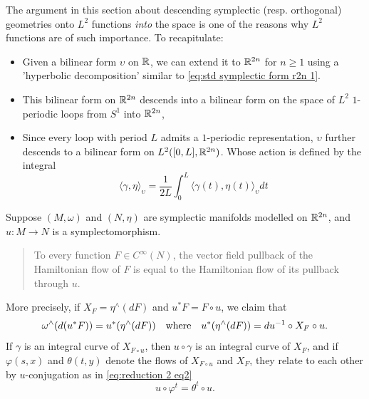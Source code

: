 \documentclass[../main-v2-manifolds.tex]{subfiles}
\begin{document}
%
%
%
%
%
%
\begin{note}
    The argument in this section about descending symplectic (resp. orthogonal) geometries onto $L^2$ functions \emph{into} the space is one of the reasons why $L^2$ functions are of such importance. To recapitulate:
    \begin{itemize}
        \item Given a bilinear form $\upsilon$ on $\mathbb{R}$, we can extend it to ${\mathbb{R}^{2n}}$ for $n\geq 1$ using a 'hyperbolic decomposition' similar to \cref{eq:std symplectic form r2n 1}.
        \item This bilinear form on ${\mathbb{R}^{2n}}$ descends into a bilinear form on the space of $L^2$ $1$-periodic loops from $S^1$ into ${\mathbb{R}^{2n}}$,
        \item Since every loop with period $L$ admits a $1$-periodic representation, $\upsilon$ further descends to a bilinear form on $L^2([0,L], {\mathbb{R}^{2n}})$. Whose action is defined by the integral
        \[
            \langle \gamma,\eta\rangle_{\upsilon} = \frac{1}{2L}\int_{0}^{L}\langle\gamma(t),\eta(t)\rangle_{\upsilon}dt
        \]
    \end{itemize}
\end{note}
\begin{wts}\label{thm:wc reduction 2 symplectic structure }
    Suppose $(M,\omega)$ and $(N,\eta)$ are symplectic manifolds modelled on ${\mathbb{R}^{2n}}$, and $u:M\to N$ is a symplectomorphism. 
    \begin{quote}
        To every function $F\in C^\infty(N)$, the vector field pullback of the Hamiltonian flow of $F$ is equal to the Hamiltonian flow of its pullback through $u$.     
    \end{quote}
    More precisely, if $X_F = \eta^{\wedge}(dF)$ and $u^*F = F\circ u$, we claim that
    \begin{equation}
        \omega^{\wedge}(d(u^* F)) = u^*(\eta^{\wedge}(dF))\qqtext{where} u^*(\eta^{\wedge}(dF)) = du^{-1}\circ X_F\circ u.
        \label{eq:reduction 2 eq1}
    \end{equation}
    If $\gamma$ is an integral curve of $X_{F\circ u}$, then $u\circ \gamma$ is an integral curve of $X_F$, and if $\varphi(s,x)$ and $\theta(t,y)$ denote the flows of $X_{F\circ u}$ and $X_{F}$, they relate to each other by $u$-conjugation as in \cref{eq:reduction 2 eq2}
    \begin{equation}
        u\circ\varphi^t = \theta^t\circ u.
        \label{eq:reduction 2 eq2}
    \end{equation}
\end{wts}
\end{document}
